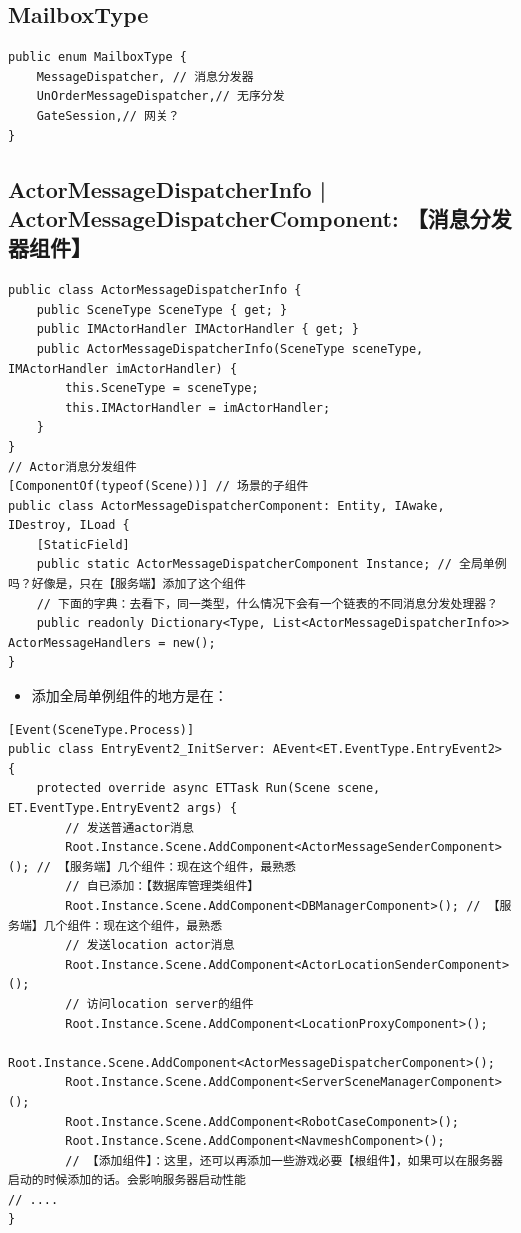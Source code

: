 \documentclass[9pt, b5paper]{article}
\begin{document}
\subsection{MailboxType}
\label{sec-2-12}
\begin{verbatim}
public enum MailboxType {
    MessageDispatcher, // 消息分发器
    UnOrderMessageDispatcher,// 无序分发
    GateSession,// 网关？
}
\end{verbatim}

\subsection{ActorMessageDispatcherInfo | ActorMessageDispatcherComponent: 【消息分发器组件】}
\label{sec-2-13}
\begin{verbatim}
public class ActorMessageDispatcherInfo {
    public SceneType SceneType { get; }
    public IMActorHandler IMActorHandler { get; }
    public ActorMessageDispatcherInfo(SceneType sceneType, IMActorHandler imActorHandler) {
        this.SceneType = sceneType;
        this.IMActorHandler = imActorHandler;
    }
}
// Actor消息分发组件
[ComponentOf(typeof(Scene))] // 场景的子组件
public class ActorMessageDispatcherComponent: Entity, IAwake, IDestroy, ILoad {
    [StaticField]
    public static ActorMessageDispatcherComponent Instance; // 全局单例吗？好像是，只在【服务端】添加了这个组件
    // 下面的字典：去看下，同一类型，什么情况下会有一个链表的不同消息分发处理器？
    public readonly Dictionary<Type, List<ActorMessageDispatcherInfo>> ActorMessageHandlers = new();
}
\end{verbatim}
\begin{itemize}
\item 添加全局单例组件的地方是在：
\end{itemize}
\begin{verbatim}
[Event(SceneType.Process)]
public class EntryEvent2_InitServer: AEvent<ET.EventType.EntryEvent2> {
    protected override async ETTask Run(Scene scene, ET.EventType.EntryEvent2 args) {
        // 发送普通actor消息
        Root.Instance.Scene.AddComponent<ActorMessageSenderComponent>(); // 【服务端】几个组件：现在这个组件，最熟悉
        // 自已添加：【数据库管理类组件】
        Root.Instance.Scene.AddComponent<DBManagerComponent>(); // 【服务端】几个组件：现在这个组件，最熟悉
        // 发送location actor消息
        Root.Instance.Scene.AddComponent<ActorLocationSenderComponent>();
        // 访问location server的组件
        Root.Instance.Scene.AddComponent<LocationProxyComponent>();
        Root.Instance.Scene.AddComponent<ActorMessageDispatcherComponent>();
        Root.Instance.Scene.AddComponent<ServerSceneManagerComponent>();
        Root.Instance.Scene.AddComponent<RobotCaseComponent>();
        Root.Instance.Scene.AddComponent<NavmeshComponent>();
        // 【添加组件】：这里，还可以再添加一些游戏必要【根组件】，如果可以在服务器启动的时候添加的话。会影响服务器启动性能
// ....
}
\end{verbatim}
\end{document}
